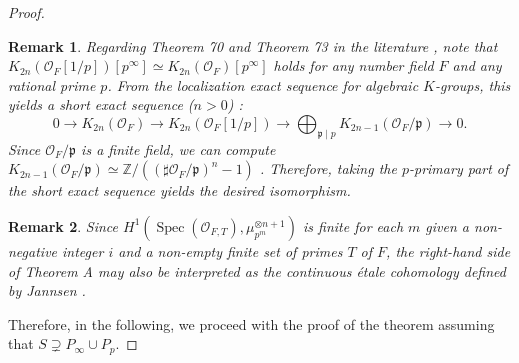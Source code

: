 \documentclass{article}
\numberwithin{equation}{section} %
\newtheorem{rem}{Remark}
\begin{document}
\begin{proof}
\begin{rem}
  Regarding Theorem 70 and Theorem 73 in the literature \cite{Weibel3}, note that $K_{2n}(\mathcal{O}_F[1/p])[p^\infty] \simeq K_{2n}(\mathcal{O}_F)[p^\infty]$ holds for any number field $F$ and any rational prime $p$. From the localization exact sequence for algebraic $K$-groups, this yields a short exact sequence ($n > 0$) \cite[Theorem 7]{Weibel3}:
  \[
    0 \longrightarrow K_{2n}(\mathcal{O}_F) \longrightarrow K_{2n}(\mathcal{O}_F[1/p]) \longrightarrow \bigoplus_{\mathfrak{p}\mid p} K_{2n-1}(\mathcal{O}_F/\mathfrak{p}) \longrightarrow 0.
  \]
  Since $\mathcal{O}_F/\mathfrak{p}$ is a finite field, we can compute $K_{2n-1}(\mathcal{O}_F/\mathfrak{p}) \simeq \mathbb{Z}/((\sharp \mathcal{O}_F/\mathfrak{p})^n - 1)$ \cite[Example 15]{Weibel3}. Therefore, taking the $p$-primary part of the short exact sequence yields the desired isomorphism.
\end{rem}

\begin{rem}
  Since $H^1(\operatorname{Spec}(\mathcal{O}_{F,T}), \mu_{p^m}^{\otimes n+1})$ is finite for each $m$ given a non-negative integer $i$ and a non-empty finite set of primes $T$ of $F$, the right-hand side of Theorem A may also be interpreted as the continuous étale cohomology defined by Jannsen \cite{Jannsen}. 
\end{rem}

Therefore, in the following, we proceed with the proof of the theorem assuming that $S \supsetneq P_\infty \cup P_p$.


\end{proof}
\end{document}
